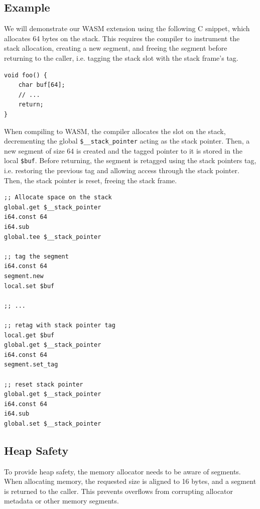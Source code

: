 \subsection{Example}
\label{subsec:example}

We will demonstrate our \ac{WASM} extension using the following C snippet, which allocates 64 bytes on the stack.
This requires the compiler to instrument the stack allocation, creating a new segment, and freeing the segment before returning to the caller, i.e. tagging the stack slot with the stack frame's tag.

\begin{lstlisting}[frame=h,style=customc,
    label={lst:wasm-example-c}]
void foo() {
    char buf[64];
    // ...
    return;
}
\end{lstlisting}

When compiling to \ac{WASM}, the compiler allocates the slot on the stack, decrementing the global \lstinline[style=customwasm]{$__stack_pointer} acting as the stack pointer.
Then, a new segment of size 64 is created and the tagged pointer to it is stored in the local \lstinline[style=customwasm]{$buf}.
Before returning, the segment is retagged using the stack pointers tag, i.e. restoring the previous tag and allowing access through the stack pointer.
Then, the stack pointer is reset, freeing the stack frame.

\begin{lstlisting}[frame=h,style=customwasm,
    label={lst:wasm-example}]
;; Allocate space on the stack
global.get $__stack_pointer
i64.const 64
i64.sub
global.tee $__stack_pointer

;; tag the segment
i64.const 64
segment.new
local.set $buf

;; ...

;; retag with stack pointer tag
local.get $buf
global.get $__stack_pointer
i64.const 64
segment.set_tag

;; reset stack pointer
global.get $__stack_pointer
i64.const 64
i64.sub
global.set $__stack_pointer
\end{lstlisting}

\subsection{Heap Safety}
\label{subsec:heap-safety}

To provide heap safety, the memory allocator needs to be aware of segments.
When allocating memory, the requested size is aligned to 16 bytes, and a segment is returned to the caller.
This prevents overflows from corrupting allocator metadata or other memory segments.

